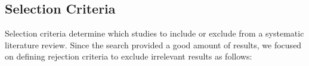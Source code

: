 \subsection{Selection Criteria}

Selection criteria determine which studies to include or exclude from a systematic literature review. 
Since the search provided a good amount of results, we focused on defining rejection criteria to exclude irrelevant results as follows:



